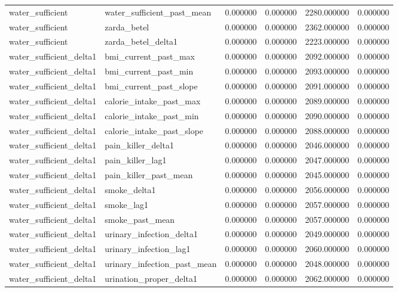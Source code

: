 \begin{longtable}{llrrrr}
water\_sufficient & water\_sufficient\_past\_mean & 0.000000 & 0.000000 & 2280.000000 & 0.000000 \\
water\_sufficient & zarda\_betel & 0.000000 & 0.000000 & 2362.000000 & 0.000000 \\
water\_sufficient & zarda\_betel\_delta1 & 0.000000 & 0.000000 & 2223.000000 & 0.000000 \\
water\_sufficient\_delta1 & bmi\_current\_past\_max & 0.000000 & 0.000000 & 2092.000000 & 0.000000 \\
water\_sufficient\_delta1 & bmi\_current\_past\_min & 0.000000 & 0.000000 & 2093.000000 & 0.000000 \\
water\_sufficient\_delta1 & bmi\_current\_past\_slope & 0.000000 & 0.000000 & 2091.000000 & 0.000000 \\
water\_sufficient\_delta1 & calorie\_intake\_past\_max & 0.000000 & 0.000000 & 2089.000000 & 0.000000 \\
water\_sufficient\_delta1 & calorie\_intake\_past\_min & 0.000000 & 0.000000 & 2090.000000 & 0.000000 \\
water\_sufficient\_delta1 & calorie\_intake\_past\_slope & 0.000000 & 0.000000 & 2088.000000 & 0.000000 \\
water\_sufficient\_delta1 & pain\_killer\_delta1 & 0.000000 & 0.000000 & 2046.000000 & 0.000000 \\
water\_sufficient\_delta1 & pain\_killer\_lag1 & 0.000000 & 0.000000 & 2047.000000 & 0.000000 \\
water\_sufficient\_delta1 & pain\_killer\_past\_mean & 0.000000 & 0.000000 & 2045.000000 & 0.000000 \\
water\_sufficient\_delta1 & smoke\_delta1 & 0.000000 & 0.000000 & 2056.000000 & 0.000000 \\
water\_sufficient\_delta1 & smoke\_lag1 & 0.000000 & 0.000000 & 2057.000000 & 0.000000 \\
water\_sufficient\_delta1 & smoke\_past\_mean & 0.000000 & 0.000000 & 2057.000000 & 0.000000 \\
water\_sufficient\_delta1 & urinary\_infection\_delta1 & 0.000000 & 0.000000 & 2049.000000 & 0.000000 \\
water\_sufficient\_delta1 & urinary\_infection\_lag1 & 0.000000 & 0.000000 & 2060.000000 & 0.000000 \\
water\_sufficient\_delta1 & urinary\_infection\_past\_mean & 0.000000 & 0.000000 & 2048.000000 & 0.000000 \\
water\_sufficient\_delta1 & urination\_proper\_delta1 & 0.000000 & 0.000000 & 2062.000000 & 0.000000 \\

\end{longtable}
